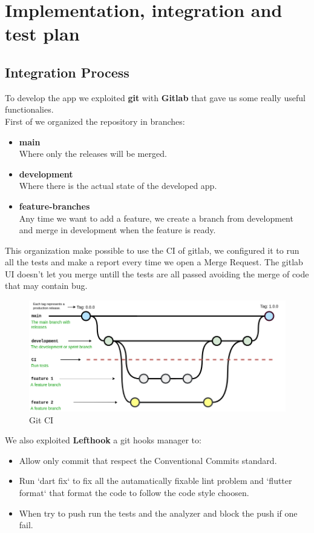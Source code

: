 \documentclass{article}
\begin{document}
\clearpage


\section{Implementation, integration and test plan}
\label{sec:ittp}

\subsection{Integration Process}
To develop the app we exploited \textbf{git} with \textbf{Gitlab} that gave us some really useful functionalies. \\
First of we organized the repository in branches:
\begin{itemize} 
	\item \textbf{main} \\
		Where only the releases will be merged.
	\item \textbf{development} \\
		Where there is the actual state of the developed app.
	\item \textbf{feature-branches} \\
		Any time we want to add a feature, we create a branch from development and merge in development when the feature is ready.
\end{itemize} 
This organization make possible to use the CI of gitlab, we configured it to run all the tests and make a report every time we open a Merge Request.
The gitlab UI doesn't let you merge untill the tests are all passed avoiding the merge of code that may contain bug.
\begin{figure}[!htb]
	\centering
	\includegraphics[width=1\textwidth]{assets/images/git-ci.drawio.png}
	\caption{Git CI}
\end{figure}

\newpage

We also exploited \textbf{Lefthook} a git hooks manager to: 
\begin{itemize} 
	\item Allow only commit that respect the Conventional Commits standard. 
	\item Run `dart fix` to fix all the autamatically fixable lint problem and `flutter format` that format the code to follow the code style choosen.
	\item When try to push run the tests and the analyzer and block the push if one fail.
\end{itemize} 
\vspace*{1cm}
\end{document}
